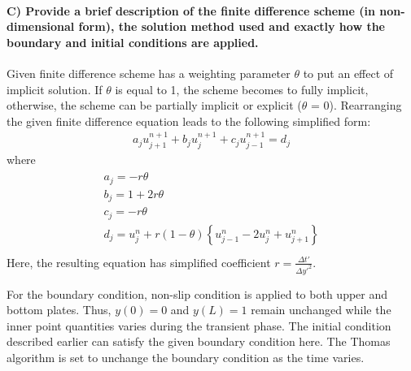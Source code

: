 \documentclass[letterpaper,10pt,english]{sphinxmanual}
\begin{document}
\paragraph{C) Provide a brief description of the finite difference scheme (in non-dimensional form), the solution method used and exactly how the boundary and initial conditions are applied.}
\label{\detokenize{cases/results:c-provide-a-brief-description-of-the-finite-difference-scheme-in-non-dimensional-form-the-solution-method-used-and-exactly-how-the-boundary-and-initial-conditions-are-applied}}
Given finite difference scheme has a weighting parameter \(\theta\) to put an effect of implicit solution. If \(\theta\) is equal to 1, the scheme becomes to fully implicit, otherwise, the scheme can be partially implicit or explicit (\(\theta\) = 0). Rearranging the given finite difference equation leads to the following simplified form:
\begin{equation*}
\begin{split}a_{j} u^{n+1}_{j+1} + b_{j} u^{n+1}_{j} + c_{j} u^{n+1}_{j-1} = d_{j}\end{split}
\end{equation*}
where
\begin{align*}\!\begin{aligned}
a_{j} = -r \theta\\
b_{j} = 1 + 2r\theta\\
c_{j} = -r\theta\\
d_{j} = u^{n}_{j} + r(1-\theta)\left \{ u^{n}_{j-1} - 2u^{n}_{j} + u^{n}_{j+1} \right \}\\
\end{aligned}\end{align*}
Here, the resulting equation has simplified coefficient \(r = \frac{\Delta t'}{\Delta y'^{2}}\).

For the boundary condition, non-slip condition is applied to both upper and bottom plates. Thus, \(y(0) = 0\) and \(y(L)=1\) remain unchanged while the inner point quantities varies during the transient phase. The initial condition described earlier can satisfy the given boundary condition here. The Thomas algorithm is set to unchange the boundary condition as the time varies.
\end{document}

